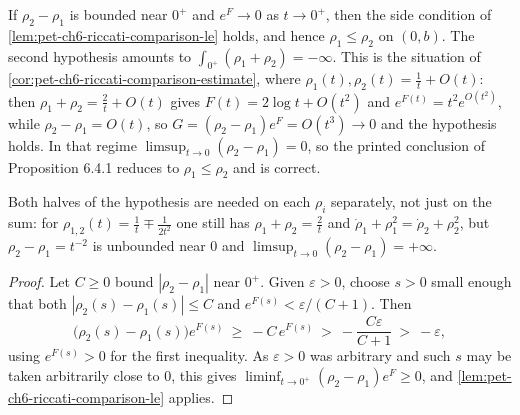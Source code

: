 \begin{remark}
  \label{rem:pet-ch6-riccati-liminf-hypothesis}
  \leanok
  If $\rho_2-\rho_1$ is bounded near $0^+$ and $e^{F}\to0$ as $t\to0^+$, then the
  side condition of \cref{lem:pet-ch6-riccati-comparison-le} holds, and hence
  $\rho_1\le\rho_2$ on $(0,b)$. The second hypothesis amounts to
  $\int_{0^+}(\rho_1+\rho_2)=-\infty$. This is the situation of
  \cref{cor:pet-ch6-riccati-comparison-estimate}, where
  $\rho_1(t),\rho_2(t)=\tfrac1t+O(t)$: then $\rho_1+\rho_2=\tfrac2t+O(t)$ gives
  $F(t)=2\log t+O(t^2)$ and $e^{F(t)}=t^2e^{O(t^2)}$, while $\rho_2-\rho_1=O(t)$,
  so $G=(\rho_2-\rho_1)e^{F}=O(t^3)\to0$ and the hypothesis holds. In that regime
  $\limsup_{t\to0}(\rho_2-\rho_1)=0$, so the printed conclusion of
  Proposition 6.4.1 reduces to $\rho_1\le\rho_2$ and is correct.

  Both halves of the hypothesis are needed on each $\rho_i$ separately, not just
  on the sum: for $\rho_{1,2}(t)=\tfrac1t\mp\tfrac1{2t^2}$ one still has
  $\rho_1+\rho_2=\tfrac2t$ and $\dot\rho_1+\rho_1^2=\dot\rho_2+\rho_2^2$, but
  $\rho_2-\rho_1=t^{-2}$ is unbounded near $0$ and
  $\limsup_{t\to0}(\rho_2-\rho_1)=+\infty$.
\end{remark}
\begin{proof}
  \leanok
  Let $C\ge0$ bound $|\rho_2-\rho_1|$ near $0^+$. Given $\varepsilon>0$, choose
  $s>0$ small enough that both $|\rho_2(s)-\rho_1(s)|\le C$ and
  $e^{F(s)}<\varepsilon/(C+1)$. Then
  \[
    \big(\rho_2(s)-\rho_1(s)\big)e^{F(s)}\ \ge\ -C\,e^{F(s)}
      \ >\ -\frac{C\varepsilon}{C+1}\ >\ -\varepsilon ,
  \]
  using $e^{F(s)}>0$ for the first inequality. As $\varepsilon>0$ was arbitrary
  and such $s$ may be taken arbitrarily close to $0$, this gives
  $\liminf_{t\to0^+}(\rho_2-\rho_1)e^{F}\ge0$, and
  \cref{lem:pet-ch6-riccati-comparison-le} applies.
\end{proof}

